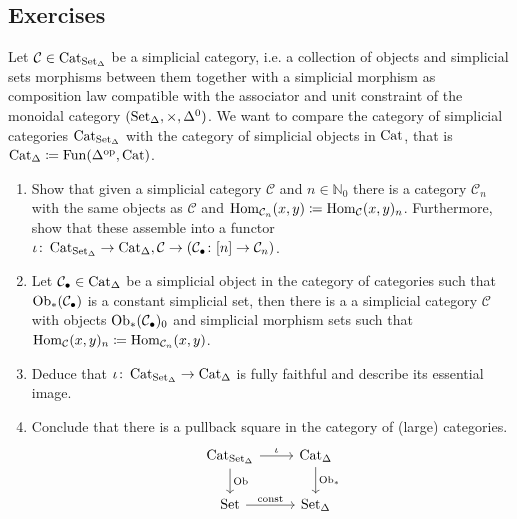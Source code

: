 \subsection{Exercises}

\begin{Exercise}
	Let $ \mathcal{ C } \in \operatorname{Cat}_{ \operatorname{Set}_{\Delta} } $ be a simplicial category, i.e. a collection of objects and simplicial sets morphisms between them together with a simplicial morphism as composition law compatible with the associator and unit constraint of the monoidal category $ ( \operatorname{Set}_{\Delta} , \times , \Delta^0 ) $. We want to compare the category of simplicial categories $ \operatorname{Cat}_{ \operatorname{Set}_{\Delta} } $ with the category of simplicial objects in $ \operatorname{Cat} $, that is $ \operatorname{Cat}_{ \Delta } \coloneqq \operatorname{Fun} ( \Delta^{ \operatorname{op} } , \operatorname{Cat} ) $.
	
	\begin{enumerate}[label=(\alph*)]
		\item 
		Show that given a simplicial category $ \mathcal{ C } $ and $ n \in \mathbb{ N }_0 $ there is a category $ \mathcal{ C }_n $ with the same objects as $ \mathcal{ C } $ and $ \operatorname{Hom}_{ \mathcal{ C }_n } ( x , y ) \coloneqq \operatorname{Hom}_{ \mathcal{ C } } ( x , y )_n $.
		Furthermore, show that these assemble into a functor $ \iota \colon \operatorname{Cat}_{ \operatorname{Set}_{\Delta} } \to \operatorname{Cat}_{ \Delta } , \mathcal{ C } \to ( \mathcal{ C }_{ \bullet } \colon [ n ] \to \mathcal{ C }_n ) $.
		
		\item 
		Let $  \mathcal{ C }_{ \bullet } \in \operatorname{Cat}_{ \Delta } $ be a simplicial object in the category of categories such that $ \operatorname{Ob}_* ( \mathcal{ C }_{ \bullet } ) $ is a constant simplicial set, then there is a a simplicial category $ \mathcal{ C } $ with objects $ \operatorname{Ob}_* ( \mathcal{ C }_{ \bullet } )_0 $ and simplicial morphism sets such that $ \operatorname{Hom}_\mathcal{ C } ( x , y )_n \coloneqq \operatorname{Hom}_{ \mathcal{ C }_n } ( x , y ) $.
		
		\item 
		Deduce that $ \iota \colon \operatorname{Cat}_{ \operatorname{Set}_{\Delta} } \to \operatorname{Cat}_{ \Delta } $ is fully faithful and describe its essential image.
		
		\item 
		Conclude that there is a pullback square in the category of (large) categories.
		\[
		\begin{tikzcd}
			\Cat_{ \SetD } 
			\ar[r, "\iota"]
			\ar[d, "\Ob"]
			&
			\Cat_{ \Delta }
			\ar[d, "\Ob_*"]
			\\
			\Set
			\ar[r, "\const"]
			&
			\SetD
		\end{tikzcd}
		\]
	\end{enumerate}
\end{Exercise}
